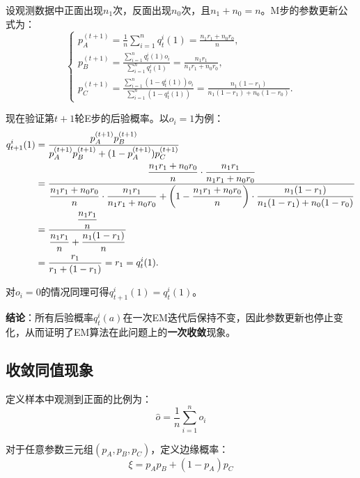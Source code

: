 \documentclass[12pt,a4paper]{article}
\begin{document}
设观测数据中正面出现$n_1$次，反面出现$n_0$次，且$n_1 + n_0 = n$。M步的参数更新公式为：
\begin{equation}
\begin{cases}
p_A^{(t+1)} = \displaystyle\frac{1}{n}\sum_{i=1}^n q_t^i(1) = \frac{n_1 r_1 + n_0 r_0}{n}, \\[8pt]
p_B^{(t+1)} = \displaystyle\frac{\sum_{i=1}^n q_t^i(1) o_i}{\sum_{i=1}^n q_t^i(1)} = \frac{n_1 r_1}{n_1 r_1 + n_0 r_0}, \\[8pt]
p_C^{(t+1)} = \displaystyle\frac{\sum_{i=1}^n (1 - q_t^i(1)) o_i}{\sum_{i=1}^n (1 - q_t^i(1))} = \frac{n_1(1 - r_1)}{n_1(1 - r_1) + n_0(1 - r_0)}.
\end{cases}
\label{eq:m_step}
\end{equation}

现在验证第$t+1$轮E步的后验概率。以$o_i=1$为例：
\begin{align}
q_{t+1}^i(1) &= \frac{p_A^{(t+1)} p_B^{(t+1)}}{p_A^{(t+1)} p_B^{(t+1)} + (1-p_A^{(t+1)}) p_C^{(t+1)}} \notag \\
&= \frac{\displaystyle\frac{n_1 r_1 + n_0 r_0}{n} \cdot \frac{n_1 r_1}{n_1 r_1 + n_0 r_0}}{\displaystyle\frac{n_1 r_1 + n_0 r_0}{n} \cdot \frac{n_1 r_1}{n_1 r_1 + n_0 r_0} + \left(1-\frac{n_1 r_1 + n_0 r_0}{n}\right) \cdot \frac{n_1(1 - r_1)}{n_1(1 - r_1) + n_0(1 - r_0)}} \notag \\
&= \frac{\displaystyle\frac{n_1 r_1}{n}}{\displaystyle\frac{n_1 r_1}{n} + \frac{n_1(1-r_1)}{n}} \notag \\
&= \frac{r_1}{r_1 + (1-r_1)} = r_1 = q_t^i(1).
\label{eq:convergence_proof}
\end{align}

对$o_i=0$的情况同理可得$q_{t+1}^i(1) = q_t^i(1)$。

\textbf{结论}：所有后验概率$q_t^i(a)$在一次EM迭代后保持不变，因此参数更新也停止变化，从而证明了EM算法在此问题上的\textbf{一次收敛}现象。
\subsection{收敛同值现象}

定义样本中观测到正面的比例为：
\begin{equation}
\hat{o} = \frac{1}{n}\sum_{i=1}^n o_i
\end{equation}

对于任意参数三元组$(p_A, p_B, p_C)$，定义边缘概率：
\begin{equation}
\xi = p_A p_B + (1-p_A) p_C
\end{equation}
\end{document}
